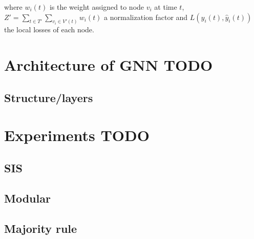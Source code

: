 where $w_i(t)$ is the weight assigned to node $v_i$ at time $t$,
$Z'=\sum_{t \in T'} \sum_{v_i \in V'(t)}w_i(t)$ a normalization factor
and $L(y_i(t), \hat{y}_i(t))$ the local losses of each node.

\section{Architecture of GNN TODO}
\subsection{Structure/layers}
\section{Experiments TODO}
\subsection{SIS}
\subsection{Modular}
\subsection{Majority rule}